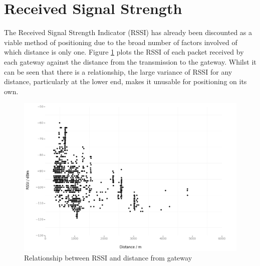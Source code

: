 \documentclass[a4paper]{report}
\begin{document}
  \section{Received Signal Strength}

    The Received Signal Strength Indicator (RSSI) has already been discounted as a viable method of positioning due to the broad number of factors involved of which distance is only one. Figure \ref{fig:rssidistance} plots the RSSI of each packet received by each gateway against the distance from the transmission to the gateway. Whilst it can be seen that there is a relationship, the large variance of RSSI for any distance, particularly at the lower end, makes it unusable for positioning on its own.

    \begin{figure}[ht]
    \centering
    \includegraphics[width=15cm]{figures/rssidistance.png}
    \caption{Relationship between RSSI and distance from gateway}
    \label{fig:rssidistance}
    \end{figure}


\end{document}
